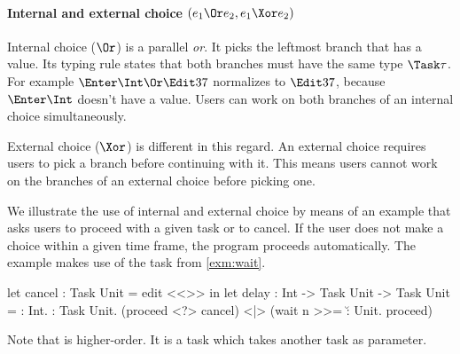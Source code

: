 \paragraph{Internal and external choice $(e_1 \Or e_2, e_1 \Xor e_2)$}

Internal choice ($\Or$) is a parallel \emph{or}.
It picks the leftmost branch that has a value.
Its typing rule  states that both branches must have the same type $\Task \tau$.
For example $\Enter \Int \Or \Edit 37$ normalizes to $\Edit 37$, because $\Enter \Int$ doesn't have a value.
Users can work on both branches of an internal choice simultaneously.

External choice ($\Xor$) is different in this regard.
An external choice requires users to pick a branch before continuing with it.
This means users cannot work on the branches of an external choice before picking one.


\begin{example}[Delay]
\label{exm:delay}


We illustrate the use of internal and external choice by means of
an example that asks users to proceed with a given task or to cancel.
If the user does not make a choice within a given time frame, the program proceeds automatically.
The example makes use of the task  from \cref{exm:wait}.
\begin{TASK}
  let cancel : Task Unit = edit <<>> in
  let delay : Int -> Task Unit -> Task Unit = \n : Int. \proceed : Task Unit.
    (proceed <?> cancel) <|> (wait n >>= \u : Unit. proceed)
\end{TASK}
Note that  is higher-order.
It is a task which takes another task as parameter.

\end{example}

%
%
%

